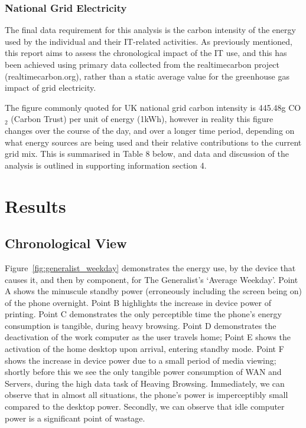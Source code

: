 \documentclass[conference]{IEEEtran}
\begin{document}
\subsubsection{National Grid Electricity}

The final data requirement for this analysis is the carbon intensity
of the energy used by the individual and their IT-related
activities. As previously mentioned, this report aims to assess the
chronological impact of the IT use, and this has been achieved using
primary data collected from the realtimecarbon project
(realtimecarbon.org), rather than a static average value for the
greenhouse gas impact of grid electricity.

The figure commonly quoted for UK national grid carbon intensity is
445.48g CO$_2$ (Carbon Trust) per unit of energy (1kWh), however in
reality this figure changes over the course of the day, and over a
longer time period, depending on what energy sources are being used
and their relative contributions to the current grid mix. This is
summarised in Table 8 below, and data and discussion of the analysis
is outlined in supporting information section 4.


\section{Results}

\subsection{Chronological View}

Figure~\ref{fig:generalist_weekday} demonstrates the energy use, by
the device that causes it, and then by component, for The Generalist’s
`Average Weekday'. Point A shows the minuscule standby power
(erroneously including the screen being on) of the phone
overnight. Point B highlights the increase in device power of
printing. Point C demonstrates the only perceptible time the phone’s
energy consumption is tangible, during heavy browsing. Point D
demonstrates the deactivation of the work computer as the user travels
home; Point E shows the activation of the home desktop upon arrival,
entering standby mode. Point F shows the increase in device power due
to a small period of media viewing; shortly before this we see the
only tangible power consumption of WAN and Servers, during the high
data task of Heaving Browsing.  Immediately, we can observe that in
almost all situations, the phone’s power is imperceptibly small
compared to the desktop power. Secondly, we can observe that idle
computer power is a significant point of wastage.
\end{document}

